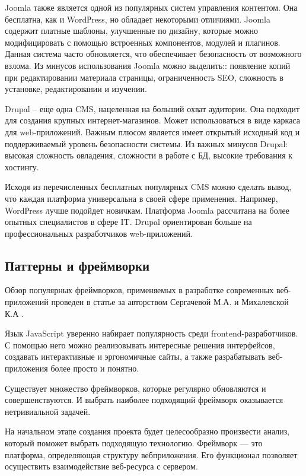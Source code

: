 Joomla также является одной из популярных систем управления контентом.
Она бесплатна, как и WordРress, но обладает некоторыми отличиями.
Joomla содержит платные шаблоны, улучшенные по дизайну, которые можно модифицировать с помощью встроенных компонентов, модулей и плагинов.
Данная система часто обновляется, что обеспечивает безопасность от возможного взлома.
Из минусов использования Joomla можно выделить:: появление копий при редактировании материала страницы, ограниченность SEO, сложность в установке, редактировании и изучении.

Drupal -- еще одна CMS, нацеленная на больший охват аудитории.
Она подходит для создания крупных интернет-магазинов.
Может использоваться в виде каркаса для web-приложений.
Важным плюсом является имеет открытый исходный код и поддерживаемый уровень безопасности системы.
Из важных минусов Drupal: высокая сложность овладения, сложности в работе с БД, высокие требования к хостингу.

Исходя из перечисленных бесплатных популярных CMS можно сделать вывод, что каждая платформа универсальна в своей сфере применения.
Например, WordРress лучше подойдет новичкам.
Платформа Joomla рассчитана на более опытных специалистов в сфере IT.
Drupal ориентирован больше на профессиональных разработчиков web-приложений. 


\subsection{Паттерны и фреймворки}

Обзор популярных фреймворков, применяемых в разработке современных веб-приложений проведен в статье за авторством Сергачевой М.А. и Михалевской К.А \cite{sergacheva-framework}.

Язык JavaScript уверенно набирает популярность среди frontend-разработчиков.
С помощью него можно реализовывать интересные решения интерфейсов, создавать интерактивные и эргономичные сайты, а также разрабатывать веб-приложения более просто и понятно.

Существует множество фреймворков, которые регулярно обновляются и совершенствуются.
И выбрать наиболее подходящий фреймворк оказывается нетривиальной задачей.

На начальном этапе создания проекта будет целесообразно произвести анализ, который поможет
выбрать подходящую технологию.
Фреймворк — это платформа, определяющая структуру вебприложения.
Его функционал позволяет осуществить взаимодействие веб-ресурса с сервером.

